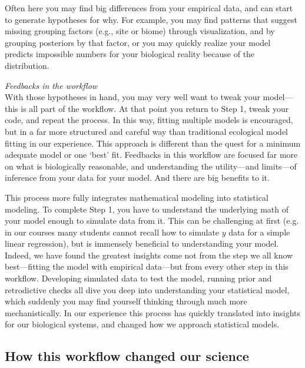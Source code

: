 \documentclass[11pt]{article}
\begin{document}
{Often here you may find big differences from your empirical data, and can start to generate hypotheses for why. For example, you may find patterns that suggest missing grouping factors (e.g., site or biome) through visualization, and by grouping posteriors by that factor, or you may quickly realize your model predicts impossible numbers for your biological reality because of the distribution. 

\emph{Feedbacks in the workflow}\\
With those hypotheses in hand, you may very well want to tweak your model---this is all part of the workflow. At that point you return to Step 1, tweak your code, and repeat the process. In this way, fitting multiple models is encouraged, but in a far more structured and careful way than traditional ecological model fitting in our experience. This approach is different than the quest for a minimum adequate model or one `best' fit. Feedbacks in this workflow are focused far more on what is biologically reasonable, and understanding the utility---and limits---of inference from your data for your model. And there are big benefits to it. 

This process more fully integrates mathematical modeling into statistical modeling. To complete Step 1, you have to understand the underlying math of your model enough to simulate data from it. This can be challenging at first (e.g. in our courses many students cannot recall how to simulate $y$ data for a simple linear regression), but is immensely beneficial to understanding your model. Indeed, we have found the greatest insights come not from the step we all know best---fitting the model with empirical data---but from every other step in this workflow. Developing simulated data to test the model, running prior and retrodictive checks all dive you deep into understanding your statistical model, which suddenly you may find yourself thinking through much more mechanistically. In our experience this process has quickly translated into insights for our biological systems, and changed how we approach statistical models. 

\subsection{How this workflow changed our science} %

}
\end{document}
